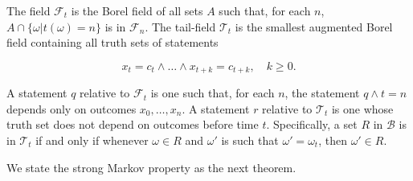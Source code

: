The field $\mathcal{F}_t$ is the Borel field of all sets $A$ such that, for each $n$, $A \cap \{\omega | t(\omega) = n\}$ is in $\mathcal{F}_n$. The tail-field $\mathcal{T}_t$ is the smallest augmented Borel field containing all truth sets of statements

$$x_t = c_t \wedge \dots \wedge x_{t+k} = c_{t+k}, \quad k \geq 0.$$

A statement $q$ relative to $\mathcal{F}_t$ is one such that, for each $n$, the statement $q \wedge t = n$ depends only on outcomes $x_0, \dots, x_n$. A statement $r$ relative to $\mathcal{T}_t$ is one whose truth set does not depend on outcomes before time $t$. Specifically, a set $R$ in $\mathcal{B}$ is in $\mathcal{T}_t$ if and only if whenever $\omega \in R$ and $\omega'$ is such that $\omega' = \omega_t$, then $\omega' \in R$.

We state the strong Markov property as the next theorem.
